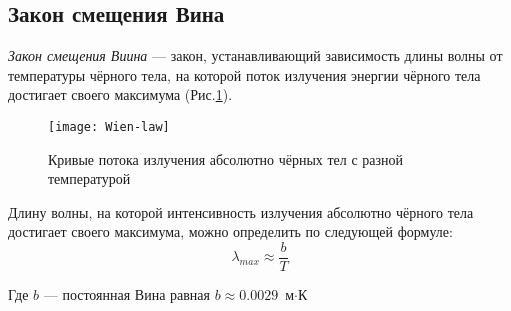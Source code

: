 \subsection{Закон смещения Вина}
\textit{Закон смещения Виина} --- закон, устанавливающий зависимость длины волны от температуры чёрного тела, на которой поток излучения энергии чёрного тела достигает своего максимума (Рис.\ref{pic:wien-law}).

\begin{figure}[h!]
\begin{center}
\texttt{[image: Wien-law]}
\end{center}
\caption{Кривые потока излучения абсолютно чёрных тел с разной температурой}\label{pic:wien-law}
\end{figure}

Длину волны, на которой интенсивность излучения абсолютно чёрного тела достигает своего максимума, можно определить по следующей формуле:
\begin{equation}
\lambda_{max}\approx\frac{b}{T}
\end{equation}

Где $b$ --- постоянная Вина равная $b\approx0.0029 $ $\text{м} \cdot \text{К}$
